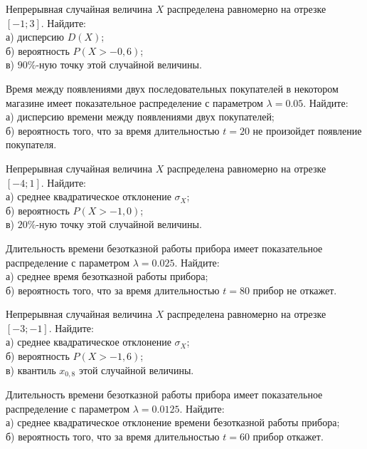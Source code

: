 \vfill

\newpage\setcounter{zad}{0}

\z Непрерывная случайная величина $X$ распределена равномерно на отрезке $[-1; 3]$. Найдите: \\ \quad а) дисперсию $D(X)$; \\ \quad б) вероятность $P(X>-0{,}6)$; \\ \quad в) $90\%$-ную точку этой случайной величины.


\vfill

\z Время между появлениями двух последовательных покупателей в некотором магазине имеет показательное распределение с параметром $\lambda = 0.05$. Найдите: \\ \quad а) дисперсию времени между появлениями двух покупателей; \\ \quad б) вероятность того, что за время длительностью $t = 20$ не произойдет появление покупателя.
 

\vfill

\newpage\setcounter{zad}{0}

\z Непрерывная случайная величина $X$ распределена равномерно на отрезке $[-4; 1]$. Найдите: \\ \quad а) среднее квадратическое отклонение $\sigma_X$; \\ \quad б) вероятность $P(X>-1{,}0)$; \\ \quad в) $20\%$-ную точку этой случайной величины.


\vfill

\z Длительность времени безотказной работы прибора имеет показательное распределение с параметром $\lambda = 0.025$. Найдите: \\ \quad а) среднее время безотказной работы прибора; \\ \quad б) вероятность того, что за время длительностью $t = 80$ прибор не откажет.
 

\vfill

\newpage\setcounter{zad}{0}

\z Непрерывная случайная величина $X$ распределена равномерно на отрезке $[-3; -1]$. Найдите: \\ \quad а) среднее квадратическое отклонение $\sigma_X$; \\ \quad б) вероятность $P(X>-1{,}6)$; \\ \quad в) квантиль $x_{0{,}8}$ этой случайной величины.


\vfill

\z Длительность времени безотказной работы прибора имеет показательное распределение с параметром $\lambda = 0.0125$. Найдите: \\ \quad а) среднее квадратическое отклонение времени безотказной работы прибора; \\ \quad б) вероятность того, что за время длительностью $t = 60$ прибор  откажет.
 

